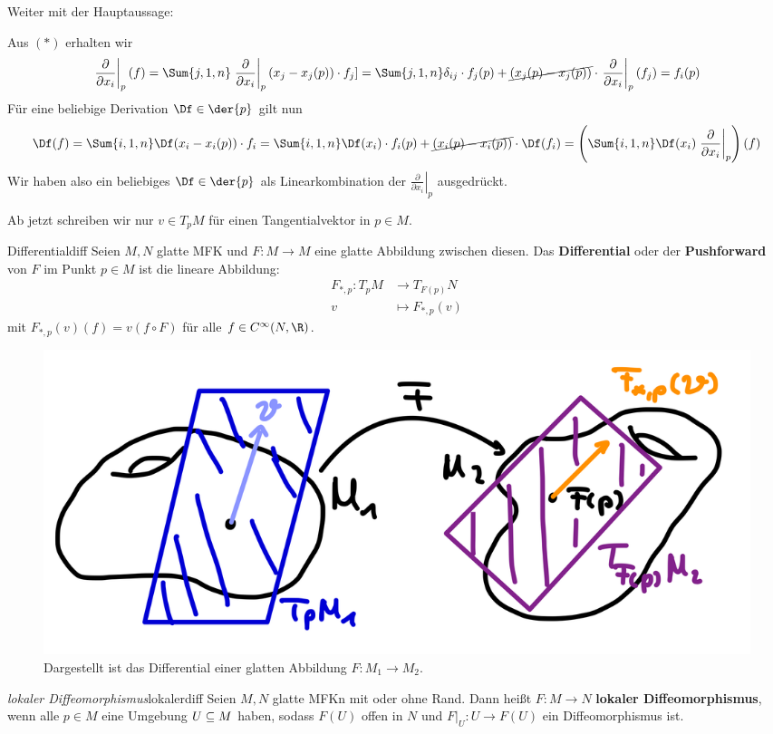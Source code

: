Weiter mit der Hauptaussage:
\begin{beweis}
Aus $(\ast)$ erhalten wir
\begin{equation}
\left. \frac{\partial}{\partial x_i}\right|_p (f) = \Sum{j,1,n} \left. \frac{\partial}{\partial x_i}\right|_p (x_j - x_j(p)) \cdot f_j] = \Sum{j,1,n} \delta_{ij} \cdot f_j (p) + \cancel{(x_j(p)-x_j(p))} \cdot \left. \frac{\partial}{\partial x_i}\right|_p (f_j) = f_i(p)
\end{equation}
Für eine beliebige Derivation $\Df \in \der{p}$ gilt nun
\begin{equation}
\Df (f) = \Sum{i, 1,n} \Df(x_i - x_i (p)) \cdot f_i = \Sum{i,1,n} \Df(x_i) \cdot f_i(p)+\cancel{(x_i(p)-x_i(p))} \cdot \Df (f_i) = \left( \Sum{i,1,n} \Df (x_i) \left.\frac{\partial}{\partial x_i}\right|_p \right)(f)
\end{equation}
Wir haben also ein beliebiges $\Df \in \der{p}$ als Linearkombination der $\left.\frac{\partial}{\partial x_i}\right|_p$ ausgedrückt.
\end{beweis}
\begin{warning}
Ab jetzt schreiben wir nur $v \in T_pM$ für einen Tangentialvektor in $p \in M$.
\end{warning}
\begin{definition}{Differential}{diff}
Seien $M,N$ glatte MFK und $F: M \to M$ eine glatte Abbildung zwischen diesen. Das \textbf{Differential} oder der \textbf{Pushforward} von $F$ im Punkt $p \in M$ ist die lineare Abbildung:
\begin{align}
F_{\ast, p}: T_pM &\to T_{F(p)}N \\
v &\mapsto F_{\ast, p} (v)
\end{align}
mit $F_{\ast, p} (v)(f) = v(f \circ F)$ für alle $f \in C^\infty (N, \R)$.
\begin{figure}[H]
\label{fig:differential}
\centering
\includegraphics[width=0.3\linewidth]{Bilder/differential.png}
\caption{Dargestellt ist das Differential einer glatten Abbildung $F: M_1 \to M_2$.}
\end{figure}
\end{definition}
\begin{definition}{\textit{lokaler Diffeomorphismus}}{lokalerdiff}
Seien $M,N$ glatte MFKn mit oder ohne Rand. Dann heißt $F: M \to N$ \textbf{lokaler Diffeomorphismus}, wenn alle $p \in M$ eine Umgebung $U \subseteq M$ haben, sodass $F(U)$ offen in $N$ und $F|_U: U \to F(U)$ ein Diffeomorphismus ist.
\end{definition}
